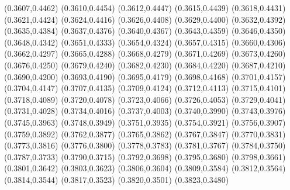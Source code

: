 \PST@Filltriangle(0.3607,0.4462)
\PST@Filltriangle(0.3610,0.4454)
\PST@Filltriangle(0.3612,0.4447)
\PST@Filltriangle(0.3615,0.4439)
\PST@Filltriangle(0.3618,0.4431)
\PST@Filltriangle(0.3621,0.4424)
\PST@Filltriangle(0.3624,0.4416)
\PST@Filltriangle(0.3626,0.4408)
\PST@Filltriangle(0.3629,0.4400)
\PST@Filltriangle(0.3632,0.4392)
\PST@Filltriangle(0.3635,0.4384)
\PST@Filltriangle(0.3637,0.4376)
\PST@Filltriangle(0.3640,0.4367)
\PST@Filltriangle(0.3643,0.4359)
\PST@Filltriangle(0.3646,0.4350)
\PST@Filltriangle(0.3648,0.4342)
\PST@Filltriangle(0.3651,0.4333)
\PST@Filltriangle(0.3654,0.4324)
\PST@Filltriangle(0.3657,0.4315)
\PST@Filltriangle(0.3660,0.4306)
\PST@Filltriangle(0.3662,0.4297)
\PST@Filltriangle(0.3665,0.4288)
\PST@Filltriangle(0.3668,0.4279)
\PST@Filltriangle(0.3671,0.4269)
\PST@Filltriangle(0.3673,0.4260)
\PST@Filltriangle(0.3676,0.4250)
\PST@Filltriangle(0.3679,0.4240)
\PST@Filltriangle(0.3682,0.4230)
\PST@Filltriangle(0.3684,0.4220)
\PST@Filltriangle(0.3687,0.4210)
\PST@Filltriangle(0.3690,0.4200)
\PST@Filltriangle(0.3693,0.4190)
\PST@Filltriangle(0.3695,0.4179)
\PST@Filltriangle(0.3698,0.4168)
\PST@Filltriangle(0.3701,0.4157)
\PST@Filltriangle(0.3704,0.4147)
\PST@Filltriangle(0.3707,0.4135)
\PST@Filltriangle(0.3709,0.4124)
\PST@Filltriangle(0.3712,0.4113)
\PST@Filltriangle(0.3715,0.4101)
\PST@Filltriangle(0.3718,0.4089)
\PST@Filltriangle(0.3720,0.4078)
\PST@Filltriangle(0.3723,0.4066)
\PST@Filltriangle(0.3726,0.4053)
\PST@Filltriangle(0.3729,0.4041)
\PST@Filltriangle(0.3731,0.4028)
\PST@Filltriangle(0.3734,0.4016)
\PST@Filltriangle(0.3737,0.4003)
\PST@Filltriangle(0.3740,0.3990)
\PST@Filltriangle(0.3743,0.3976)
\PST@Filltriangle(0.3745,0.3963)
\PST@Filltriangle(0.3748,0.3949)
\PST@Filltriangle(0.3751,0.3935)
\PST@Filltriangle(0.3754,0.3921)
\PST@Filltriangle(0.3756,0.3907)
\PST@Filltriangle(0.3759,0.3892)
\PST@Filltriangle(0.3762,0.3877)
\PST@Filltriangle(0.3765,0.3862)
\PST@Filltriangle(0.3767,0.3847)
\PST@Filltriangle(0.3770,0.3831)
\PST@Filltriangle(0.3773,0.3816)
\PST@Filltriangle(0.3776,0.3800)
\PST@Filltriangle(0.3778,0.3783)
\PST@Filltriangle(0.3781,0.3767)
\PST@Filltriangle(0.3784,0.3750)
\PST@Filltriangle(0.3787,0.3733)
\PST@Filltriangle(0.3790,0.3715)
\PST@Filltriangle(0.3792,0.3698)
\PST@Filltriangle(0.3795,0.3680)
\PST@Filltriangle(0.3798,0.3661)
\PST@Filltriangle(0.3801,0.3642)
\PST@Filltriangle(0.3803,0.3623)
\PST@Filltriangle(0.3806,0.3604)
\PST@Filltriangle(0.3809,0.3584)
\PST@Filltriangle(0.3812,0.3564)
\PST@Filltriangle(0.3814,0.3544)
\PST@Filltriangle(0.3817,0.3523)
\PST@Filltriangle(0.3820,0.3501)
\PST@Filltriangle(0.3823,0.3480)
